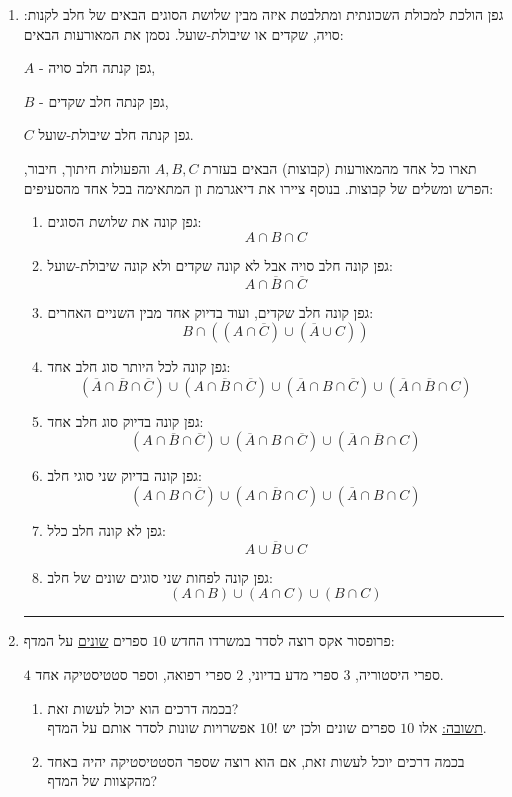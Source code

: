 \documentclass[12pt, a4paper]{article}
\newcommand{\ol}{\overline}
\begin{document}
\begin{enumerate}


\item
גפן הולכת למכולת השכונתית ומתלבטת איזה מבין שלושת הסוגים הבאים של חלב לקנות: סויה, שקדים או שיבולת-שועל.
נסמן את המאורעות הבאים:

$A$
-
גפן קנתה חלב סויה,

$B$
-
גפן קנתה חלב שקדים,

$C$
גפן קנתה חלב שיבולת-שועל.

תארו כל אחד מהמאורעות (קבוצות) הבאים בעזרת
$A,B,C$
והפעולות חיתוך, חיבור, הפרש ומשלים של קבוצות. בנוסף ציירו את דיאגרמת ון המתאימה בכל אחד מהסעיפים:
\begin{enumerate}
\item
גפן קונה את שלושת הסוגים:
$$\boxed{A\cap B\cap C}$$
\item
גפן קונה חלב סויה  אבל לא קונה שקדים ולא קונה שיבולת-שועל:
$$\boxed{A\cap \ol{B}\cap \ol{C}}$$
\item
גפן קונה חלב שקדים, ועוד בדיוק אחד מבין השניים האחרים:
$$\boxed{B\cap ((A\cap \ol{C}) \cup (\ol{A}\cup C))}$$
\item
גפן קונה לכל היותר סוג חלב אחד:
$$\boxed{(\ol{A}\cap \ol{B}\cap \ol{C})
\cup
(A\cap \ol{B}\cap \ol{C})\cup
(\ol{A}\cap B\cap \ol{C})
\cup
(\ol{A}\cap \ol{B}\cap C)}$$
\item
גפן קונה בדיוק סוג חלב אחד:
$$\boxed{(A\cap \ol{B}\cap \ol{C})\cup
(\ol{A}\cap B\cap \ol{C})
\cup
(\ol{A}\cap \ol{B}\cap C)}$$
\item
גפן קונה בדיוק שני סוגי חלב:
$$\boxed{(A\cap B\cap \ol{C})\cup
(A\cap \ol{B}\cap C)
\cup
(\ol{A}\cap B\cap C)}$$
\item
גפן לא קונה חלב כלל:
$$\boxed{\ol{A\cup B\cup C}}$$
\item 
גפן קונה לפחות שני סוגים שונים של חלב:
$$\boxed{(A\cap B)\cup (A\cap C)\cup (B\cap C)}$$
\end{enumerate}

\noindent\rule{15cm}{0.4pt}

\newpage

\item
פרופסור אקס רוצה לסדר במשרדו החדש
$10$
ספרים 
\underline{שונים}
על המדף:

$4$
ספרי היסטוריה,
$3$
ספרי מדע בדיוני,
$2$
ספרי רפואה,
וספר סטטיסטיקה אחד.
\begin{enumerate}
\item
בכמה דרכים הוא יכול לעשות זאת?
\\

\underline{תשובה:}
אלו
$10$
ספרים שונים ולכן יש
$\boxed{10!}$
אפשרויות שונות לסדר אותם על המדף.
\\
\item
בכמה דרכים יוכל לעשות זאת, אם הוא רוצה שספר הסטטיסטיקה יהיה באחד מהקצוות של המדף?
\\


\end{enumerate}
\end{enumerate}
\end{document}
